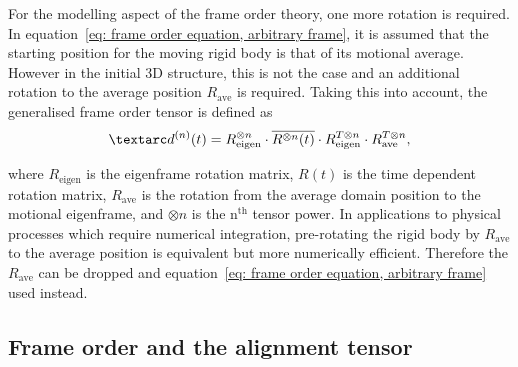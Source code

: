 For the modelling aspect of the frame order theory, one more rotation is required.
In equation~\ref{eq: frame order equation, arbitrary frame}, it is assumed that the starting position for the moving rigid body is that of its motional average.
However in the initial 3D structure, this is not the case and an additional rotation to the average position $R_\textrm{ave}$ is required.
Taking this into account, the generalised frame order tensor is defined as
\begin{equation}
    \FOn(t) = R_\textrm{eigen}^{\otimes n} \cdot \overline{R^{\otimes n}(t)} \cdot R_\textrm{eigen}^{T \otimes n} \cdot R_\textrm{ave}^{T \otimes n} ,
\end{equation}

where $R_\textrm{eigen}$ is the eigenframe rotation matrix, $R(t)$ is the time dependent rotation matrix, $R_\textrm{ave}$ is the rotation from the average domain position to the motional eigenframe, and $\otimes n$ is the n$^\textrm{th}$ tensor power.
In applications to physical processes which require numerical integration, pre-rotating the rigid body by $R_\textrm{ave}$ to the average position is equivalent but more numerically efficient.
Therefore the $R_\textrm{ave}$ can be dropped and equation~\ref{eq: frame order equation, arbitrary frame} used instead.

%
%
%





\subsection{Frame order and the alignment tensor}




